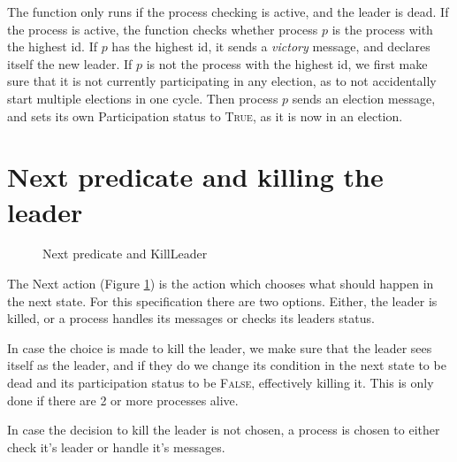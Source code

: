 \documentclass{report}
\begin{document}
The function only runs if the process checking is active, and the leader is dead. If the process is active, the function checks whether process $p$ is the process with the highest id. If $p$ has the highest id, it sends a \textit{victory} message, and declares itself the new leader. If $p$ is not the process with the highest id, we first make sure that it is not currently participating in any election, as to not accidentally start multiple elections in one cycle. Then process $p$ sends an election message, and sets its own Participation status to \textsc{True}, as it is now in an election.


\section{Next predicate and killing the leader}
\begin{figure}

\tlatex
\@x{}\moduleLeftDash{}\moduleRightDash\@xx{}%

%
%
%
\@pvspace{8.0pt}%
%

\fl{}\bottombar\cl{}
\caption{Next predicate and KillLeader}
\label{nextpredkillleader}
\end{figure}

The Next action (Figure \ref{nextpredkillleader}) is the action which chooses what should happen in the next state.
For this specification there are two options. Either, the leader is killed, or a process handles its messages or checks its leaders status.

In case the choice is made to kill the leader, we make sure that the leader sees itself as the leader, and if they do we change its condition in the next state to be dead and its participation status to be \textsc{False}, effectively killing it. This is only done if there are 2 or more processes alive.

In case the decision to kill the leader is not chosen, a process is chosen to either check it's leader or handle it's messages.
\end{document}
